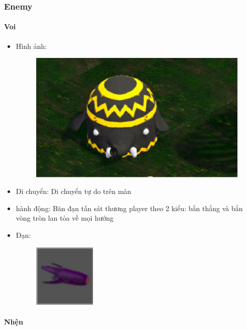 \documentclass[../report.tex]{subfiles}
\begin{document}
\subsubsection{Enemy}
\paragraph{Voi}

\begin{itemize}
\item Hình ảnh:
\begin{figure}[H]
\centering
\includegraphics[width=13cm]{figures/voi.png}
\end{figure}

\item Di chuyển: Di chuyển tự do trên màn
\item hành động: Băn đạn tấn sát thương player theo 2 kiểu: bắn thắng và bắn vòng tròn lan tỏa về mọi hướng
\item Đạn: 
\begin{figure}[H]
\includegraphics[width=3cm]{figures/voi-dan.png}
\end{figure}
\end{itemize}

\paragraph{Nhện}
\end{document}
